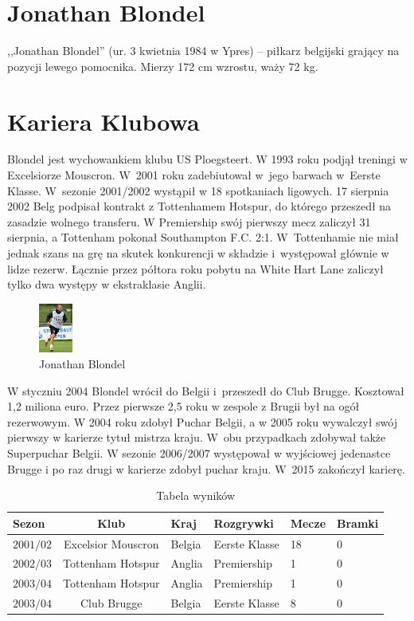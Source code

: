 \documentclass[a4paper,12pt]{article}
\title{}
\author{\texttildelow Adam Rembiewski}
\begin{document}
\maketitle
\section{Jonathan Blondel}
,,Jonathan Blondel'' (ur. 3 kwietnia 1984 w Ypres) – piłkarz belgijski grający na pozycji lewego pomocnika. Mierzy 172 cm wzrostu, waży 72 kg.
\section{Kariera Klubowa}
Blondel jest wychowankiem klubu US Ploegsteert. W 1993 roku podjął treningi w Excelsiorze Mouscron. W~2001 roku zadebiutował w~jego barwach w~Eerste Klasse. W~sezonie 2001/2002 wystąpił w 18 spotkaniach ligowych. 17 sierpnia 2002 Belg podpisał kontrakt z Tottenhamem Hotspur, do którego przeszedł na zasadzie wolnego transferu. W Premiership swój pierwszy mecz zaliczył 31 sierpnia, a Tottenham pokonał Southampton F.C. 2:1. W~Tottenhamie nie miał jednak szans na grę na skutek konkurencji w składzie i~występował głównie w lidze rezerw. Łącznie przez półtora roku pobytu na White Hart Lane zaliczył tylko dwa występy w ekstraklasie Anglii.
\begin{figure}
\begin{center}
\vspace{-20pt}
\includegraphics[width=0.1\textwidth,natwidth=165,natheight=240]{fotki/fotka.jpg}
\end{center}
\vspace{-20pt}
\caption{Jonathan Blondel}
\vspace{-10pt}
\end{figure}
W styczniu 2004 Blondel wrócił do Belgii i~przeszedł do Club Brugge. Kosztował 1,2 miliona euro. Przez pierwsze 2,5 roku w zespole z Brugii był na ogół rezerwowym. W 2004 roku zdobył Puchar Belgii, a w 2005 roku wywalczył swój pierwszy w karierze tytuł mistrza kraju. W~obu przypadkach zdobywał także Superpuchar Belgii. W sezonie 2006/2007 występował w wyjściowej jedenastce Brugge i po raz drugi w karierze zdobył puchar kraju. W~2015 zakończył karierę.
\begin{table}
\begin{tabular}{lcllll}
\hline
\textbf{Sezon}&\textbf{Klub}&\textbf{Kraj}&\textbf{Rozgrywki}&\textbf{Mecze}&\textbf{Bramki}\\
\hline
$2001/02$ & Excelsior Mouscron&Belgia&Eerste Klasse&18&0 \\
$2002/03$ & Tottenham Hotspur&Anglia&Premiership&1&0 \\
$2003/04$ & Tottenham Hotspur&Anglia&Premiership&1&0 \\
$2003/04$ & Club Brugge&Belgia&Eerste Klasse&8&0 \\
\hline
\end{tabular}
\caption{Tabela wyników}
\end{table}
\end{document}
